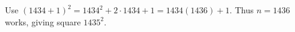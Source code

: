 Use $(1434+1)^2=1434^2+2\cdot1434+1=1434(1436)+1$. Thus $\boxed{n=1436}$ works, giving square $1435^2$.
